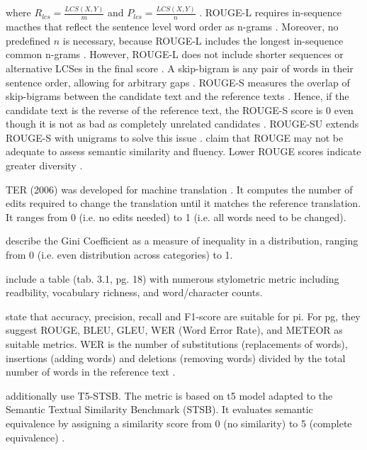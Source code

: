 where $R_{lcs} = \frac{LCS(X,Y)}{m}$ and $P_{lcs} = \frac{LCS(X,Y)}{n}$ \citep{lin_rouge_2004}.
ROUGE-L requires in-sequence macthes that reflect the sentence level word order as n-grams \citep{lin_rouge_2004}.
Moreover, no predefined $n$ is necessary, because ROUGE-L includes the longest in-sequence common n-grams \citep{lin_rouge_2004}.
However, ROUGE-L does not include shorter sequences or alternative LCSes in the final score \citep{lin_rouge_2004}.
A skip-bigram is any pair of words in their sentence order, allowing for arbitrary gaps \citep{lin_rouge_2004}.
ROUGE-S measures the overlap of skip-bigrams between the candidate text and the reference texts \citep{lin_rouge_2004}.
Hence, if the candidate text is the reverse of the reference text, the ROUGE-S score is 0 even though it is not as bad as completely unrelated candidates \citep{lin_rouge_2004}.
ROUGE-SU extends ROUGE-S with unigrams to solve this issue \citep{lin_rouge_2004}.
\citet{kurt_pehlivanoglu_comparative_2024} claim that ROUGE may not be adequate to assess semantic similarity and fluency.
Lower ROUGE scores indicate greater diversity \citep{kurt_pehlivanoglu_comparative_2024}.

TER (2006) was developed for machine translation \citep{zhou_paraphrase_2021}.
It computes the number of edits required to change the translation until it matches the reference translation.
It ranges from 0 (i.e. no edits needed) to 1 (i.e. all words need to be changed).

\citet{fu_learning_2024} describe the Gini Coefficient as a measure of inequality in a distribution, ranging from 0 (i.e. even distribution across categories) to 1.

\citet{master_thesis_paraphrasing_2024} include a table (tab. 3.1, pg. 18) with numerous stylometric metric including readbility, vocabulary richness, and word/character counts.

\citet{palivela_optimization_2021} state that accuracy, precision, recall and F1-score are suitable for \ac{pi}.
For \ac{pg}, they suggest ROUGE, BLEU, GLEU, WER (Word Error Rate), and METEOR as suitable metrics.
WER is the number of substitutions (replacements of words), insertions (adding words) and deletions (removing words) 
divided by the total number of words in the reference text \citep{palivela_optimization_2021}.

\citet{kurt_pehlivanoglu_comparative_2024} additionally use T5-STSB.
The metric is based on \ac{t5} model adapted to the Semantic Textual Similarity Benchmark (STSB).
It evaluates semantic equivalence by assigning a similarity score from 0 (no similarity) to 5 (complete equivalence) \citep{kurt_pehlivanoglu_comparative_2024}.


